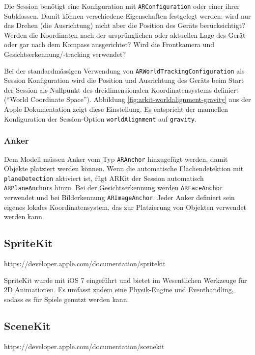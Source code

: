 Die Session benötigt eine Konfiguration mit \texttt{ARConfiguration} oder einer ihrer Subklassen. Damit können verschiedene Eigenschaften festgelegt werden: wird nur das Drehen (die Ausrichtung) nicht aber die Position des Geräts berücksichtigt? Werden die Koordinaten nach der ursprünglichen oder aktuellen Lage des Gerät oder gar nach dem Kompass ausgerichtet? Wird die Frontkamera und Gesichtserkennung/-tracking verwendet?

Bei der standardmässigen Verwendung von \texttt{ARWorldTrackingConfiguration} als Session Konfiguration wird die Position und Ausrichtung des Geräts beim Start der Session als Nullpunkt des dreidimensionalen Koordinatensystems definiert ("`World Coordinate Space"'). Abbildung \ref{fig:arkit-worldalignment-gravity} aus der Apple Dokumentation zeigt diese Einstellung. Es entspricht der manuellen Konfiguration der Session-Option \texttt{worldAlignment} auf \texttt{gravity}.


\subsubsection{Anker}
Dem Modell müssen Anker vom Typ \texttt{ARAnchor} hinzugefügt werden, damit Objekte platziert werden können. Wenn die automatische Flächendetektion mit \texttt{planeDetection} aktiviert ist, fügt ARKit der Session automatisch \texttt{ARPlaneAnchor}s hinzu. Bei der Gesichtserkennung werden \texttt{ARFaceAnchor} verwendet und bei Bilderkennung \texttt{ARImageAnchor}. Jeder Anker definiert sein eigenes lokales Koordinatensystem, das zur Platzierung von Objekten verwendet werden kann.


\subsection{SpriteKit}
https://developer.apple.com/documentation/spritekit

SpriteKit wurde mit iOS 7 eingeführt und bietet im Wesentlichen Werkzeuge für 2D Animationen. Es umfasst zudem eine Physik-Engine und Eventhandling, sodass es für Spiele genutzt werden kann.


\subsection{SceneKit}
https://developer.apple.com/documentation/scenekit
